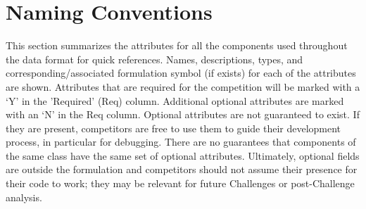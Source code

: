 \documentclass{article}
\begin{document}
\section{Naming Conventions}
\label{sec:naming}
This section summarizes the attributes for all the components used throughout the data format for quick references.
Names, descriptions, types, and corresponding/associated formulation symbol (if exists) for each of the attributes are shown.
Attributes that are required for the competition
will be marked with a `Y' in the 'Required' (Req) column.
Additional optional attributes are marked with an `N' in the Req column.
Optional attributes are not guaranteed to exist. If they are present, competitors are free to use them to guide their development process, in particular for debugging. There are no guarantees that components of the same class have the same set of optional attributes. 
Ultimately, optional fields are outside the formulation and competitors should not assume their presence for their code to work; they may be relevant for future Challenges or post-Challenge analysis.
\end{document}
